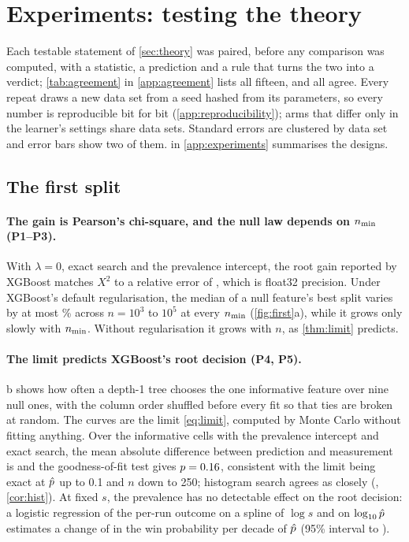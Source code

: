 \section{Experiments: testing the theory}\label{sec:experiments}

Each testable statement of \cref{sec:theory} was paired, before any comparison was computed, with a statistic, a prediction and a rule that turns the two into a verdict; \cref{tab:agreement} in \cref{app:agreement} lists all fifteen, and all agree. Every repeat draws a new data set from a seed hashed from its parameters, so every number is reproducible bit for bit (\cref{app:reproducibility}); arms that differ only in the learner's settings share data sets. Standard errors are clustered by data set and error bars show two of them.  in \cref{app:experiments} summarises the designs.

\subsection{The first split}\label{sec:exp-first}

\paragraph{The gain is Pearson's chi-square, and the null law depends on $n_{\min}$ (P1--P3).} With $\lambda = 0$, exact search and the prevalence intercept, the root gain reported by XGBoost matches $X^2$ to a relative error of \numPoneErr, which is float32 precision. Under XGBoost's default regularisation, the median of a null feature's best split varies by at most \numPthreeSpread\% across $n = 10^3$ to $10^5$ at every $n_{\min}$ (\cref{fig:first}a), while it grows only slowly with $n_{\min}$. Without regularisation it grows with $n$, as \cref{thm:limit} predicts.

\paragraph{The limit predicts XGBoost's root decision (P4, P5).} b shows how often a depth-1 tree chooses the one informative feature over nine null ones, with the column order shuffled before every fit so that ties are broken at random. The curves are the limit \eqref{eq:limit}, computed by Monte Carlo without fitting anything. Over the \numPfourCells{} informative cells with the prevalence intercept and exact search, the mean absolute difference between prediction and measurement is \numPfourMAE{} and the goodness-of-fit test gives $p = 0.16$, consistent with the limit being exact at $\hat p$ up to 0.1 and $n$ down to 250; histogram search agrees as closely (\numPfourMAEhist, \cref{cor:hist}). At fixed $s$, the prevalence has no detectable effect on the root decision: a logistic regression of the per-run outcome on a spline of $\log s$ and on $\log_{10}\hat p$ estimates a change of \numPfiveAME{} in the win probability per decade of $\hat p$ (95\% interval \numPfiveLo{} to \numPfiveHi).

